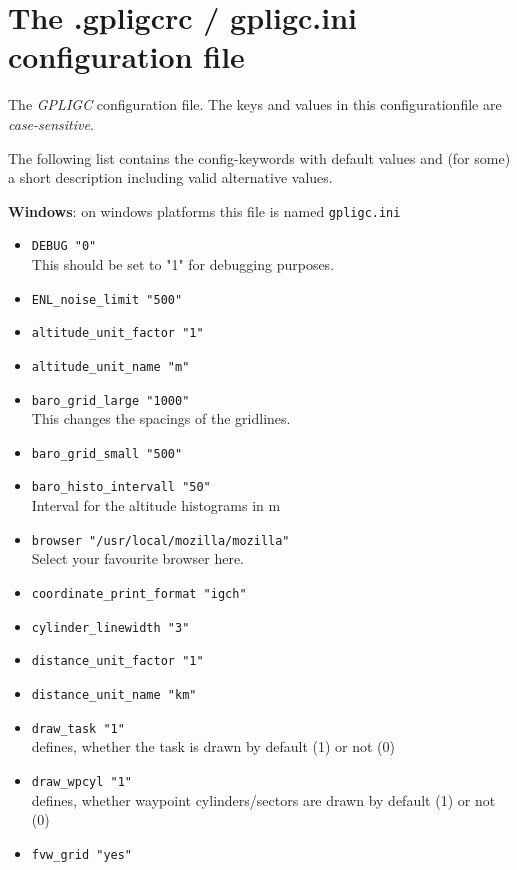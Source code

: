 \section{The .gpligcrc / gpligc.ini configuration file}
\label{gpligcrc}
The \emph{GPLIGC} configuration file.
The keys and values in this configurationfile are \emph{case-sensitive}.

The following list contains the config-keywords with default values and (for some)
a short description including valid alternative values.

\textbf{Windows}: on windows platforms this file is named \texttt{gpligc.ini}

\begin{itemize}

\item \texttt{DEBUG    "0"} \\
 This should be set to "1" for debugging purposes.

\item \texttt{ENL\_noise\_limit    "500"}
\item \texttt{altitude\_unit\_factor    "1"}
\item \texttt{altitude\_unit\_name    "m"}
\item \texttt{baro\_grid\_large    "1000"} \\
 This changes the spacings of the gridlines.
\item \texttt{baro\_grid\_small    "500"}
\item \texttt{baro\_histo\_intervall    "50"}\\
    Interval for the altitude histograms in m
\item \texttt{browser    "/usr/local/mozilla/mozilla"}\\
 Select your favourite browser here.
\item \texttt{coordinate\_print\_format    "igch"}
\item \texttt{cylinder\_linewidth    "3"}
\item \texttt{distance\_unit\_factor    "1"}
\item \texttt{distance\_unit\_name    "km"}
\item \texttt{draw\_task "1"} \\
defines, whether the task is drawn by default (1) or not (0)
\item \texttt{draw\_wpcyl "1"}\\
defines, whether waypoint cylinders/sectors are drawn by default (1) or not (0)
\item \texttt{fvw\_grid    "yes"}


\end{itemize}

